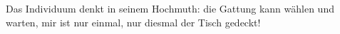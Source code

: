 Das Individuum denkt in seinem Hochmuth: die Gattung kann wählen und warten, mir ist nur einmal, nur diesmal der Tisch gedeckt!
\par

